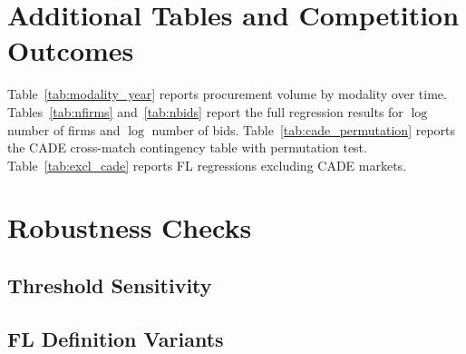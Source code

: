 
\section{Additional Tables and Competition Outcomes}
\label{app:competition}

Table~\ref{tab:modality_year} reports procurement volume by modality
over time. Tables~\ref{tab:nfirms} and~\ref{tab:nbids} report the
full regression results for $\log$ number of firms and $\log$ number
of bids. Table~\ref{tab:cade_permutation} reports the CADE
cross-match contingency table with permutation test.
Table~\ref{tab:excl_cade} reports FL regressions excluding CADE
markets.











\section{Robustness Checks}
\label{app:robustness}

\subsection{Threshold Sensitivity}

\begin{table}[htbp]
\centering
\caption{Price Coefficient Across IQR Multiplier Thresholds}
\label{tab:threshold}

\end{table}

\subsection{FL Definition Variants}







